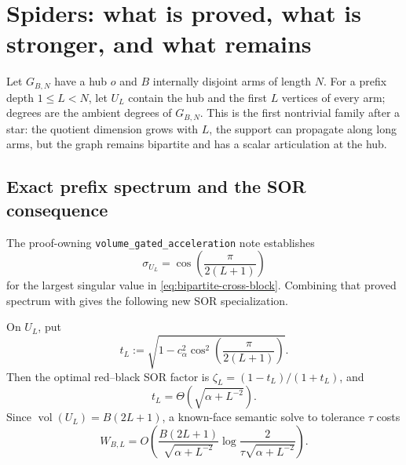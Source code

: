 \section{Spiders: what is proved, what is stronger, and what remains}
\label{sec:spider-specialization}

Let $G_{B,N}$ have a hub $o$ and $B$ internally disjoint arms of length $N$.
For a prefix depth $1\leq L<N$, let $U_L$ contain the hub and the first $L$
vertices of every arm; degrees are the ambient degrees of $G_{B,N}$.  This is
the first nontrivial family after a star: the quotient dimension grows with
$L$, the support can propagate along long arms, but the graph remains
bipartite and has a scalar articulation at the hub.

\subsection{Exact prefix spectrum and the SOR consequence}

The proof-owning \texttt{volume\_gated\_acceleration} note establishes
\begin{equation}
 \sigma_{U_L}=\cos\!\left(\frac{\pi}{2(L+1)}\right)
 \label{eq:spider-prefix-cross-singular}
\end{equation}
for the largest singular value in \eqref{eq:bipartite-cross-block}.  Combining
that proved spectrum with  gives the following
new SOR specialization.

\begin{corollary}
\label{cor:spider-prefix-sor}
On $U_L$, put
\begin{equation}
 t_L:=\sqrt{
  1-c_\alpha^2
  \cos^2\!\left(\frac{\pi}{2(L+1)}\right)
 }.
 \label{eq:spider-prefix-t}
\end{equation}
Then the optimal red--black SOR factor is
$\zeta_L=(1-t_L)/(1+t_L)$, and
\begin{equation}
 t_L=\Theta\!\left(\sqrt{\alpha+L^{-2}}\right).
 \label{eq:spider-prefix-t-asymptotic}
\end{equation}
Since
$\operatorname{vol}(U_L)=B(2L+1)$, a known-face semantic solve to tolerance
$\tau$ costs
\begin{equation}
 W_{B,L}=O\!\left(
  \frac{B(2L+1)}{\sqrt{\alpha+L^{-2}}}
  \log\frac{2}{\tau\sqrt{\alpha+L^{-2}}}
 \right).
 \label{eq:spider-prefix-sor-work}
\end{equation}
\end{corollary}

